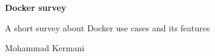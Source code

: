 \documentclass{article}
\begin{document}
	\begin{titlepage}
    	\begin{center}
        
        	\Huge
        	\textbf{Docker survey}
        	
			\large
        	\vspace{.5cm}
			A short survey about Docker use cases and its features
        	
        	\LARGE
        	\vspace{1cm}
        	Mohammad Kermani
        
    	\end{center}
	\end{titlepage}
	
\end{document}
